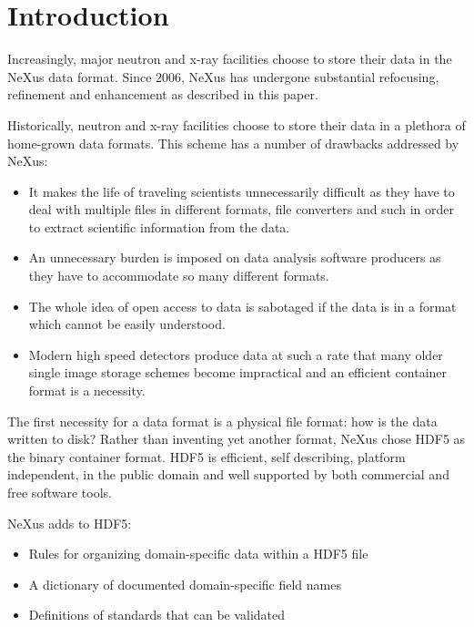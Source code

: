 \documentclass[%
 aip,
rsi,
 amsmath,amssymb,
 reprint,%
]{revtex4-1}
\begin{document}
\maketitle


\section{Introduction}
Increasingly, major neutron and x-ray facilities choose to store their data in the NeXus data format. 
Since 2006, NeXus\cite{nxold} has undergone substantial refocusing, 
refinement and enhancement as described in this paper.  

Historically, neutron and x-ray facilities choose to store their data in a plethora of 
home-grown data formats. This scheme has a number of drawbacks addressed by NeXus: 
\begin{itemize}
\item It makes the life of traveling scientists unnecessarily difficult as they have to deal with multiple files 
 in different formats, file converters and such in order to extract scientific information from the data.
 \item An unnecessary burden is imposed on data analysis software producers as they have to accommodate so many different formats.  
\item The whole idea of open access to data is sabotaged if the data is in a format which cannot be easily understood.
\item Modern high speed detectors produce data at such a rate that many older single image storage schemes become impractical and 
 an efficient container format is a necessity. 
\end{itemize}

The first necessity for a data format is a physical file format: how is the data written to disk? Rather than inventing  
yet another format, NeXus chose HDF5\cite{hdf5} as the binary container format. HDF5 is efficient, self describing, 
platform independent, in the public domain and well supported by both commercial and free software tools. 

NeXus adds to HDF5:
\begin{itemize}
\item Rules for organizing domain-specific data within a HDF5 file
\item A dictionary of documented domain-specific field names
\item Definitions of standards that can be validated
\end{itemize}
\end{document}

